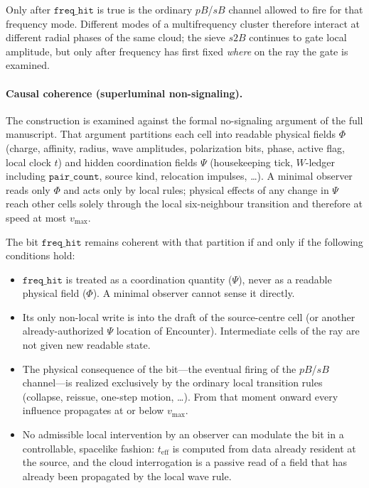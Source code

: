 \documentclass{ijuc}
\begin{document}
Only after $\texttt{freq\_hit}$ is true is the ordinary $pB$/$sB$ channel allowed to fire for that frequency mode. Different modes of a multifrequency cluster therefore interact at different radial phases of the same cloud; the sieve $s2B$ continues to gate local amplitude, but only after frequency has first fixed \emph{where} on the ray the gate is examined.

\paragraph{Causal coherence (superluminal non-signaling).}
The construction is examined against the formal no-signaling argument of the full manuscript. That argument partitions each cell into readable physical fields $\Phi$ (charge, affinity, radius, wave amplitudes, polarization bits, phase, active flag, local clock $t$) and hidden coordination fields $\Psi$ (housekeeping tick, $W$-ledger including $\texttt{pair\_count}$, source kind, relocation impulses, \ldots). A minimal observer reads only $\Phi$ and acts only by local rules; physical effects of any change in $\Psi$ reach other cells solely through the local six-neighbour transition and therefore at speed at most $v_{\max}$.

The bit $\texttt{freq\_hit}$ remains coherent with that partition if and only if the following conditions hold:

\begin{itemize}
\item $\texttt{freq\_hit}$ is treated as a coordination quantity ($\Psi$), never as a readable physical field ($\Phi$). A minimal observer cannot sense it directly.
\item Its only non-local write is into the draft of the source-centre cell (or another already-authorized $\Psi$ location of Encounter). Intermediate cells of the ray are not given new readable state.
\item The physical consequence of the bit---the eventual firing of the $pB$/$sB$ channel---is realized exclusively by the ordinary local transition rules (collapse, reissue, one-step motion, \ldots). From that moment onward every influence propagates at or below $v_{\max}$.
\item No admissible local intervention by an observer can modulate the bit in a controllable, spacelike fashion: $t_{\mathrm{eff}}$ is computed from data already resident at the source, and the cloud interrogation is a passive read of a field that has already been propagated by the local wave rule.
\end{itemize}
\end{document}
